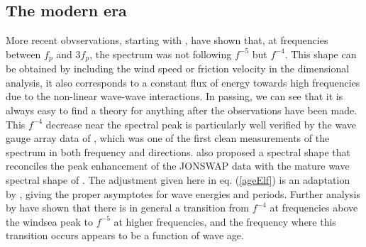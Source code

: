 \subsection{The modern era}
More recent obvservations, starting with \cite{Toba1973}, have shown that, at frequencies between 
$f_p$ and $3 f_p$, the spectrum was not following  $f^{-5}$ but  $f^{-4}$. This shape can be obtained 
by including the wind speed or friction velocity in the dimensional analysis, it also corresponds to a 
constant flux of energy towards high frequencies due to the non-linear wave-wave interactions. In passing, we can see 
that it is always easy to find a theory for anything after the observations have been made. 
This $f^{-4}$ decrease near the spectral peak is particularly well verified by the wave gauge array data of \cite{Donelan&al.1985}, 
which was one of the first clean measurements of the spectrum in both frequency and directions. \cite{Donelan&al.1985} also proposed 
a spectral shape that reconciles the peak enhancement of the JONSWAP data with the mature wave spectral shape of \cite{Pierson&Moskowitz1964}. 
The adjustment given here in eq. (\ref{ageElf}) is an adaptation by \cite{Elfouhaily&al.1997}, giving the proper asymptotes for wave energies and periods. 
Further analysis by \cite{Long&Resio2007} have shown that there is in general a transition from  $f^{-4}$ at frequencies above the windsea peak  to  $f^{-5}$ at higher frequencies, and the 
frequency where this transition occurs appears to be a function of wave age. 

